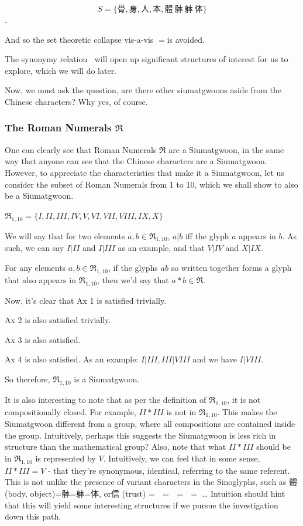 $$S=\{\text{骨}, \text{身}, \text{人}, \text{本}, \text{體} ~ \text{骵} ~\text{躰} ~\text{体}\}$$.

And so the set theoretic collapse vis-a-vis $=$is avoided. 

The synonymy relation $~$ will open up significant structures of interest for us to explore, which we will do later.

Now, we must ask the question, are there other siumatgwoons aside from the Chinese characters? Why yes, of course. 



\subsubsection{The Roman Numerals $\mathfrak{R}$}

One can clearly see that Roman Numerals $\mathfrak{R}$ are a Siumatgwoon, in the same way that anyone can see that the Chinese characters are a Siumatgwoon. However, to appreciate the characteristics that make it a Siumatgwoon, let us consider the subset of Roman Numerals from 1 to 10, which we shall show to also be a Siumatgwoon.

$\mathfrak{R}_{1,10} = \{I, II, III, IV, V, VI, VII, VIII, IX, X\}$

We will say that for two elements $a,b \in \mathfrak{R}_{1,10}$, $a|b$ iff the glyph $a$ appears in $b$. As such, we can say $I | II$ and $I|III$ as an example, and that $V|IV$ and $X|IX$. 

For any elements $a,b\in \mathfrak{R}_{1,10}$, if the glyphs $ab$ so written together forms a glyph that also appears in $\mathfrak{R}_{1,10}$, then we'd say that $a*b\in \mathfrak{R}$.

Now, it's clear that Ax 1 is satisfied trivially. 

Ax 2 is also satisfied trivially.

Ax 3 is also satisfied. 

Ax 4 is also satisfied. As an example: $I | III, III | VIII$ and we have $I|VIII$.

So therefore, $\mathfrak{R}_{1,10}$ is a Siumatgwoon. 

It is also interesting to note that as per the definition of $\mathfrak{R}_{1,10}$, it is not compositionally closed. For example, $II * III$ is not in $\mathfrak{R}_{1,10}$. This makes the Siumatgwoon different from a group, where all compositions are contained inside the group. Intuitively, perhaps this suggests the Siumatgwoon is less rich in structure than the mathematical group? Also, note that what $II * III$ should be in $\mathfrak{R}_{1,10}$ is represented by $V$. Intuitively, we can feel that in some sense, $II * III = V$ - that they're synonymous, identical, referring to the same referent. This is not unlike the presence of variant characters in the Sinoglyphs, such as 體 (body, object)=骵=躰=体, or信 (trust) = 𬢭 = 伩 = 訫 = 㐰… Intuition should hint that this will yield some interesting structures if we pursue the investigation down this path.

